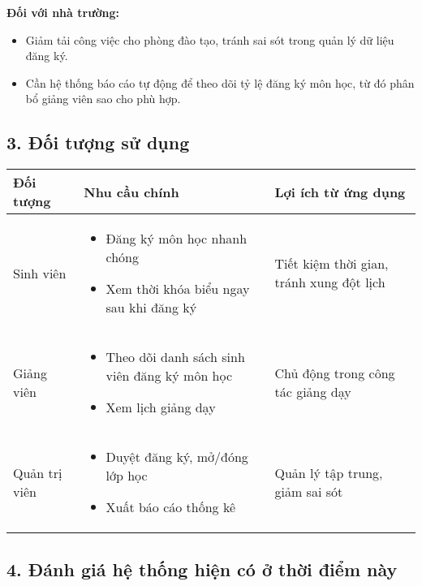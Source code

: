 \documentclass[../main.tex]{subfiles}
\begin{document}
\textbf{Đối với nhà trường:}
\begin{itemize}
    \item Giảm tải công việc cho phòng đào tạo, tránh sai sót trong quản lý dữ liệu đăng ký.
    \item Cần hệ thống báo cáo tự động để theo dõi tỷ lệ đăng ký môn học, từ đó phân bổ giảng viên sao cho phù hợp.
\end{itemize}

\subsection*{3. Đối tượng sử dụng}


\begin{center}
    \begin{table}[H]
    \begin{tabular}{|p{2.5cm}|p{6cm}|p{4cm}|}
    \hline
    \textbf{Đối tượng} & \textbf{Nhu cầu chính} & \textbf{Lợi ích từ ứng dụng} \\
    \hline
    Sinh viên & 
    \begin{itemize}
        \item Đăng ký môn học nhanh chóng
        \item Xem thời khóa biểu ngay sau khi đăng ký
    \end{itemize} & 
    Tiết kiệm thời gian, tránh xung đột lịch \\
    \hline
    Giảng viên & 
    \begin{itemize}
        \item Theo dõi danh sách sinh viên đăng ký môn học
        \item Xem lịch giảng dạy
    \end{itemize} & 
    Chủ động trong công tác giảng dạy \\
    \hline
    Quản trị viên & 
    \begin{itemize}
        \item Duyệt đăng ký, mở/đóng lớp học
        \item Xuất báo cáo thống kê
    \end{itemize} & 
    Quản lý tập trung, giảm sai sót \\
    \hline
    \end{tabular}
    \end{table}
\end{center}

\subsection*{4. Đánh giá hệ thống hiện có ở thời điểm này}
\end{document}
